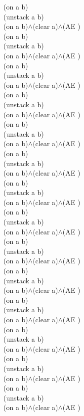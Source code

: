 {{(on a b)\\
(unstack a b)\\
(on a b)$\wedge$(clear a)$\wedge$(AE )\\
(on a b)\\
(unstack a b)\\
(on a b)$\wedge$(clear a)$\wedge$(AE )\\
(on a b)\\
(unstack a b)\\
(on a b)$\wedge$(clear a)$\wedge$(AE )\\
(on a b)\\
(unstack a b)\\
(on a b)$\wedge$(clear a)$\wedge$(AE )\\
(on a b)\\
(unstack a b)\\
(on a b)$\wedge$(clear a)$\wedge$(AE )\\
(on a b)\\
(unstack a b)\\
(on a b)$\wedge$(clear a)$\wedge$(AE )\\
(on a b)\\
(unstack a b)\\
(on a b)$\wedge$(clear a)$\wedge$(AE )\\
(on a b)\\
(unstack a b)\\
(on a b)$\wedge$(clear a)$\wedge$(AE )\\
(on a b)\\
(unstack a b)\\
(on a b)$\wedge$(clear a)$\wedge$(AE )\\
(on a b)\\
(unstack a b)\\
(on a b)$\wedge$(clear a)$\wedge$(AE )\\
(on a b)\\
(unstack a b)\\
(on a b)$\wedge$(clear a)$\wedge$(AE )\\
(on a b)\\
(unstack a b)\\
(on a b)$\wedge$(clear a)$\wedge$(AE )\\
(on a b)\\
(unstack a b)\\
(on a b)$\wedge$(clear a)$\wedge$(AE )\\
(on a b)\\
(unstack a b)\\
(on a b)$\wedge$(clear a)$\wedge$(AE )\\
}}
